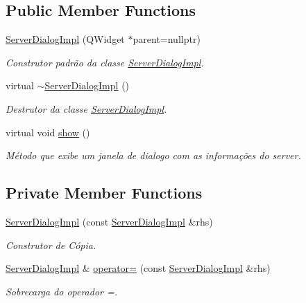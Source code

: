 \subsection*{Public Member Functions}
\begin{DoxyCompactItemize}
\item 
\hyperlink{classServerDialogImpl_a5a5cf39e32c0559a8fcdeb372fb055b3}{Server\+Dialog\+Impl} (Q\+Widget $\ast$parent=nullptr)
\begin{DoxyCompactList}\small\item\em Construtor padrão da classe \hyperlink{classServerDialogImpl}{Server\+Dialog\+Impl}. \end{DoxyCompactList}\item 
virtual \hyperlink{classServerDialogImpl_a0e73fbf7d75d033ec4ec12dc93931952}{$\sim$\+Server\+Dialog\+Impl} ()\hypertarget{classServerDialogImpl_a0e73fbf7d75d033ec4ec12dc93931952}{}\label{classServerDialogImpl_a0e73fbf7d75d033ec4ec12dc93931952}

\begin{DoxyCompactList}\small\item\em Destrutor da classe \hyperlink{classServerDialogImpl}{Server\+Dialog\+Impl}. \end{DoxyCompactList}\item 
virtual void \hyperlink{classServerDialogImpl_a6d84adfcfb187c124cc9a0a73a17c44d}{show} ()
\begin{DoxyCompactList}\small\item\em Método que exibe um janela de dialogo com as informações do server. \end{DoxyCompactList}\end{DoxyCompactItemize}
\subsection*{Private Member Functions}
\begin{DoxyCompactItemize}
\item 
\hyperlink{classServerDialogImpl_adab2dead3a4b7e4890cd53c7309cdc4c}{Server\+Dialog\+Impl} (const \hyperlink{classServerDialogImpl}{Server\+Dialog\+Impl} \&rhs)
\begin{DoxyCompactList}\small\item\em Construtor de Cópia. \end{DoxyCompactList}\item 
\hyperlink{classServerDialogImpl}{Server\+Dialog\+Impl} \& \hyperlink{classServerDialogImpl_a82cff5544b91edcd872b1a11f78c68d4}{operator=} (const \hyperlink{classServerDialogImpl}{Server\+Dialog\+Impl} \&rhs)
\begin{DoxyCompactList}\small\item\em Sobrecarga do operador =. \end{DoxyCompactList}\end{DoxyCompactItemize}
